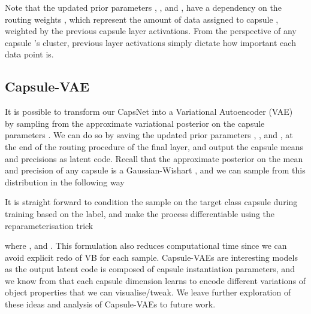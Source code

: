 \documentclass[letterpaper]{article} \usepackage{aaai20}  \usepackage{times}  \usepackage{helvet} \usepackage{courier}  \usepackage[hyphens]{url}  \usepackage{graphicx} \urlstyle{rm} \def\UrlFont{\rm}  \usepackage{graphicx}  \frenchspacing  \setlength{\pdfpagewidth}{8.5in}  \setlength{\pdfpageheight}{11in}  \nocopyright
\begin{document}
Note that the updated prior parameters , ,  and , have a dependency on the routing weights , which represent the amount of data assigned to capsule , weighted by the previous capsule layer activations. From the perspective of any capsule 's cluster, previous layer activations  simply dictate how important each data point is. 
\subsection{Capsule-VAE}
It is possible to transform our CapsNet into a Variational Autoencoder (VAE)~\cite{kingma2013auto} by sampling from the approximate variational posterior on the capsule parameters . We can do so by saving the updated prior parameters , ,  and , at the end of the routing procedure of the final layer, and output the capsule means and precisions as latent code. Recall that the approximate posterior on the mean and precision of any capsule  is a Gaussian-Wishart , and we can sample from this distribution in the following way

It is straight forward to condition the sample on the target class capsule during training based on the label, and make the process differentiable using the reparameterisation trick

where , and   . This formulation also reduces computational time since we can avoid explicit redo of VB for each sample. Capsule-VAEs are interesting models as the output latent code is composed of capsule instantiation parameters, and we know from \cite{sabour2017dynamic} that each capsule dimension learns to encode different variations of object properties that we can visualise/tweak. We leave further exploration of these ideas and analysis of Capsule-VAEs to future work.
\end{document}
